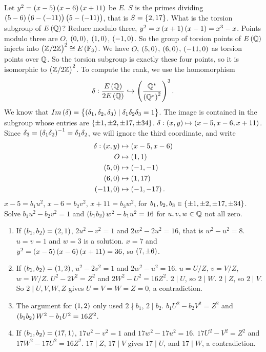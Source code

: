 Let $ y^2 = \br{x - 5}\br{x - 6}\br{x + 11} $ be $ E $. $ S $ is the primes dividing $ \br{5 - 6}\br{6 - \br{-11}}\br{5 - \br{-11}} $, that is $ S = \cbr{2, 17} $. What is the torsion subgroup of $ E\br{\Q} $? Reduce modulo three, $ y^2 = x\br{x + 1}\br{x - 1} = x^3 - x $. Points modulo three are $ O $, $ \br{0, 0} $, $ \br{1, 0} $, $ \br{-1, 0} $. So the group of torsion points of $ E\br{\Q} $ injects into $ \br{\Z / 2\Z}^2 \cong E\br{\F_3} $. We have $ O $, $ \br{5, 0} $, $ \br{6, 0} $, $ \br{-11, 0} $ as torsion points over $ \mathbb{Q} $. So the torsion subgroup is exactly these four points, so it is isomorphic to $ \br{\Z / 2\Z}^2 $. To compute the rank, we use the homomorphism
$$ \delta : \dfrac{E\br{\Q}}{2E\br{\Q}} \hookrightarrow \br{\dfrac{\Q^*}{\br{\Q^*}^2}}^3. $$
We know that $ Im\br{\delta} = \cbr{\br{\delta_1, \delta_2, \delta_3} \mid \delta_1\delta_2\delta_3 = 1} $. The image is contained in the subgroup whose entries are $ \cbr{\pm 1, \pm 2, \pm 17, \pm 34} $. $ \delta : \br{x, y} \mapsto \br{x - 5, x - 6, x + 11} $. Since $ \delta_3 = \br{\delta_1\delta_2}^{-1} = \delta_1\delta_2 $, we will ignore the third coordinate, and write
\begin{align*}
\delta : \br{x, y} & \mapsto \br{x - 5, x - 6} \\
O & \mapsto \br{1, 1} \\
\br{5, 0} & \mapsto \br{-1, -1} \\
\br{6, 0} & \mapsto \br{1, 17} \\
\br{-11, 0} & \mapsto \br{-1, -17}.
\end{align*}
$ x - 5 = b_1u^2 $, $ x - 6 = b_2v^2 $, $ x + 11 = b_3w^2 $, for $ b_1, b_2, b_3 \in \cbr{\pm 1, \pm 2, \pm 17, \pm 34} $. Solve $ b_1u^2 - b_2v^2 = 1 $ and $ \br{b_1b_2}w^2 - b_1u^2 = 16 $ for $ u, v, w \in \mathbb{Q} $ not all zero.
\begin{enumerate}
\item If $ \br{b_1, b_2} = \br{2, 1} $, $ 2u^2 - v^2 = 1 $ and $ 2w^2 - 2u^2 = 16 $, that is $ w^2 - u^2 = 8 $. $ u = v = 1 $ and $ w = 3 $ is a solution. $ x = 7 $ and $ y^2 = \br{x - 5}\br{x - 6}\br{x + 11} = 36 $, so $ \br{7, \pm 6} $.
\item If $ \br{b_1, b_2} = \br{1, 2} $, $ u^2 - 2v^2 = 1 $ and $ 2w^2 - u^2 = 16 $. $ u = U / Z $, $ v = V / Z $, $ w = W / Z $. $ U^2 - 2V^2 = Z^2 $ and $ 2W^2 - U^2 = 16Z^2 $. $ 2 \mid U $, so $ 2 \mid W $. $ 2 \mid Z $, so $ 2 \mid V $. So $ 2 \mid U, V, W, Z $ gives $ U = V = W = Z = 0 $, a contradiction.
\item The argument for $ \br{1, 2} $ only used $ 2 \nmid b_1 $, $ 2 \mid b_2 $. $ b_1U^2 - b_2V^2 = Z^2 $ and $ \br{b_1b_2}W^2 - b_1U^2 = 16Z^2 $.
\item If $ \br{b_1, b_2} = \br{17, 1} $, $ 17u^2 - v^2 = 1 $ and $ 17w^2 - 17u^2 = 16 $. $ 17U^2 - V^2 = Z^2 $ and $ 17W^2 - 17U^2 = 16Z^2 $. $ 17 \mid Z $, $ 17 \mid V $ gives $ 17 \mid U $, and $ 17 \mid W $, a contradiction.
\end{enumerate}
